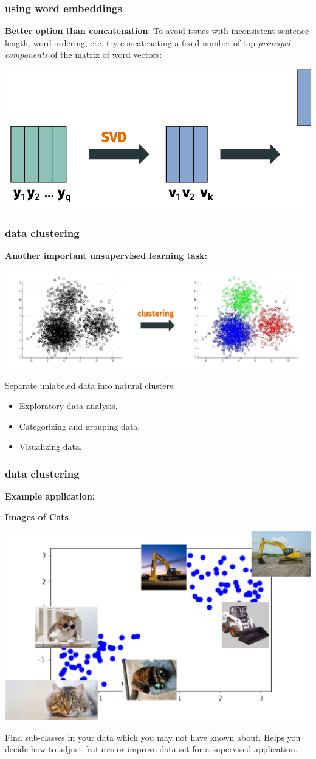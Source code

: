 \documentclass[handout,compress]{beamer}
\begin{document}
\begin{frame}
	\frametitle{using word embeddings}
	\textbf{Better option than concatenation}: 
	To avoid issues with inconsistent sentence length, word ordering, etc. try concatenating a fixed number of top \emph{principal components} of the matrix of word vectors:
	\begin{center}
		\includegraphics[width=.6\textwidth]{better_concat.png}
	\end{center}
\end{frame}
	
\begin{frame}
	\frametitle{data clustering}
	\textbf{Another important unsupervised learning task:} 
	\begin{center}
		\includegraphics[width=\textwidth]{clustering_obj.png}
	\end{center}
Separate unlabeled data into natural clusters.
\begin{itemize}
	\item Exploratory data analysis. 
	\item Categorizing and grouping data. 
	\item Visualizing data. 
\end{itemize}
\end{frame}

\begin{frame}
	\frametitle{data clustering}
	\textbf{Example application:}
	\begin{center}
		\textbf{Images of Cats}.
		
		\includegraphics[width=.7\textwidth]{clustering_use.png}
	\end{center}
	Find sub-classes in your data which you may not have known about. Helps you decide how to adjust features or improve data set for a supervised application.
\end{frame}
\end{document}
